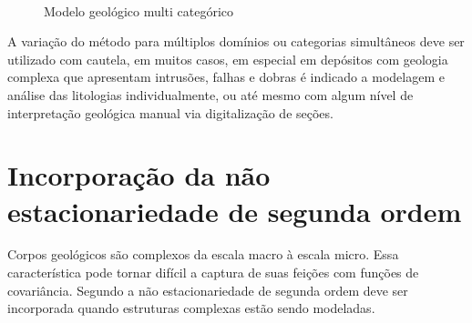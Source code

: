 \begin{figure}[H]
\caption{Modelo geológico multi categórico} 
\label{multi_cat_rbf}
\begin{center}
\\
\end{center}
\begin{center}
\end{center}
\end{figure}

A variação do método para múltiplos domínios ou categorias simultâneos deve ser utilizado com cautela, em muitos casos, em especial em depósitos com geologia complexa que apresentam intrusões, falhas e dobras é indicado a modelagem e análise das litologias individualmente, ou até mesmo com algum nível de interpretação geológica manual via digitalização de seções.

\section{Incorporação da não estacionariedade de segunda ordem}

Corpos geológicos são complexos da escala macro à escala micro. Essa característica pode tornar difícil a captura de suas feições com funções de covariância. Segundo  a não estacionariedade de segunda ordem deve ser incorporada quando estruturas complexas estão sendo modeladas.


